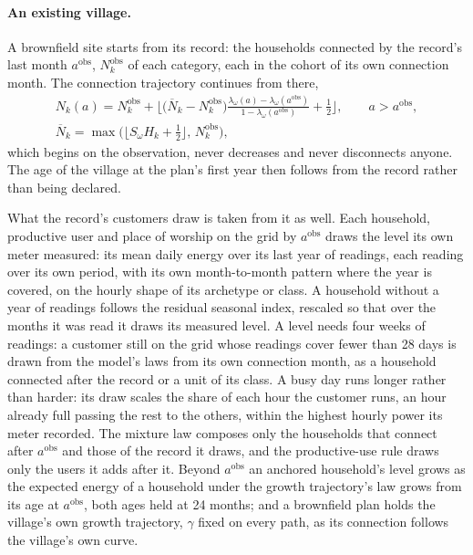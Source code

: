 \documentclass[11pt,a4paper]{article}
\theoremstyle{plain}
\theoremstyle{definition}
\begin{document}
\paragraph{An existing village.} A brownfield site starts from its record: the households
connected by the record's last month $a^{\mathrm{obs}}$, $N^{\mathrm{obs}}_k$ of each
category, each in the cohort of its own connection month. The connection trajectory
continues from there,
\begin{equation}
  \begin{gathered}
  N_k(a) = N^{\mathrm{obs}}_k + \Big\lfloor \big(\overline{N}_k - N^{\mathrm{obs}}_k\big)
  \frac{\lambda_\omega(a)-\lambda_\omega(a^{\mathrm{obs}})}{1-\lambda_\omega(a^{\mathrm{obs}})}
  + \tfrac12 \Big\rfloor,
  \qquad a > a^{\mathrm{obs}},\\
  \overline{N}_k = \max\Big(\Big\lfloor S_\omega H_k + \tfrac12\Big\rfloor,\,
  N^{\mathrm{obs}}_k\Big),
  \end{gathered}
  \label{eq:connection-brownfield}
\end{equation}
which begins on the observation, never decreases and never disconnects anyone. The age of
the village at the plan's first year then follows from the record rather than being
declared.

What the record's customers draw is taken from it as well. Each household, productive user
and place of worship on the grid by $a^{\mathrm{obs}}$ draws the level its own meter
measured: its mean daily energy over its last year of readings, each reading over its own
period, with its own month-to-month pattern where the year is covered, on the hourly shape
of its archetype or class. A household without a year of readings follows the residual
seasonal index, rescaled so that over the months it was read it draws its measured level. A
level needs four weeks of readings: a customer still on the grid whose readings cover fewer
than 28 days is drawn from the model's laws from its own connection month, as a household
connected after the record or a unit of its class. A busy day runs longer rather than
harder: its draw scales the share of each hour the customer runs, an hour already full
passing the rest to the others, within the highest hourly power its meter recorded. The
mixture law composes only the households that connect after $a^{\mathrm{obs}}$ and those of
the record it draws, and the productive-use rule draws only the users it adds after it. Beyond $a^{\mathrm{obs}}$ an anchored household's level grows as
the expected energy of a household under the growth trajectory's law grows from its age at
$a^{\mathrm{obs}}$, both ages held at 24 months; and a brownfield plan holds the village's
own growth trajectory, $\gamma$ fixed on every path, as its connection follows the village's
own curve.
\end{document}
